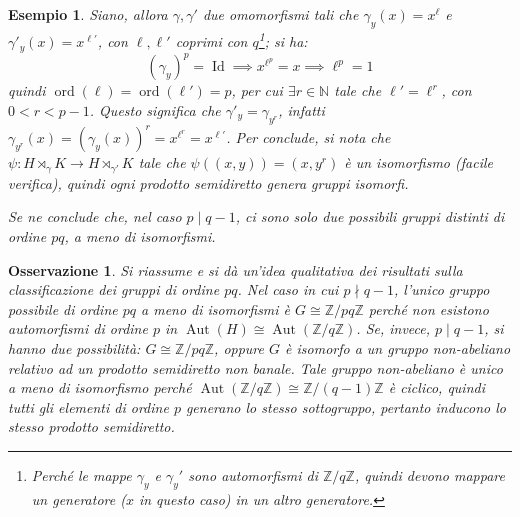 \documentclass[12pt]{scrartcl}
\theoremstyle{style}
\newtheorem{esempio}{Esempio}[section]
\newtheorem{osservazione}{Osservazione}[section]
\numberwithin{equation}{subsection}
\begin{document}
\begin{esempio}
	Siano, allora $\gamma, \gamma'$ due omomorfismi tali che $\gamma_y(x) = x^\ell $ e $\gamma'_y(x) = x^{\ell '} $, con $\ell ,\ell '$ coprimi con $q$\footnote{Perch\'e le mappe $\gamma_y$ e $\gamma_y'$ sono automorfismi di $\mathbb{Z} / q\mathbb{Z}$, quindi devono mappare un generatore ($x$ in questo caso) in un altro generatore.}; si ha:
	\[
		(\gamma_y)^p = \operatorname{Id} \implies x^{\ell ^p} =x\implies \ell ^p = 1
	\] 
	quindi $\operatorname{ord}(\ell ) = \operatorname{ord}(\ell ') =p$, per cui $\exists r \in \mathbb{N}$ tale che $\ell ' = \ell ^r $, con $0 < r < p-1$.
	Questo significa che $\gamma'_y = \gamma_{y^r} $, infatti $\gamma_{y^r} (x) =( \gamma_y(x))^r = x^{\ell ^r} = x^{\ell '} $.
Per conclude, si nota che $\psi : H \rtimes _\gamma K\longrightarrow H \rtimes _{\gamma'} K$ tale che $\psi ((x,y)) = (x,y^r)$ \`e un isomorfismo (facile verifica), quindi ogni prodotto semidiretto genera gruppi isomorfi.

Se ne conclude che, nel caso $p  \mid  q-1$, ci sono solo due possibili gruppi distinti di ordine $pq$, a meno di isomorfismi.
\end{esempio}
\begin{osservazione}
Si riassume e si d\`a un'idea qualitativa dei risultati sulla classificazione dei gruppi di ordine $pq$. 
Nel caso in cui $p  \nmid q-1$, l'unico gruppo possibile di ordine $pq$ a meno di isomorfismi \`e $G \cong \mathbb{Z} / pq\mathbb{Z}$ perch\'e non esistono automorfismi di ordine $p$ in $\operatorname{Aut} (H)\cong \operatorname{Aut} (\mathbb{Z}/q\mathbb{Z})$.
Se, invece, $p  \mid q-1$, si hanno due possibilit\`a: $G \cong \mathbb{Z}/ pq\mathbb{Z}$, oppure $G$ \`e isomorfo a un gruppo non-abeliano relativo ad un prodotto semidiretto non banale. 
Tale gruppo non-abeliano \`e unico a meno di isomorfismo perch\'e $\operatorname{Aut} (\mathbb{Z}/q\mathbb{Z}) \cong \mathbb{Z}/(q-1)\mathbb{Z}$ \`e ciclico, quindi tutti gli elementi di ordine $p$ generano lo stesso sottogruppo, pertanto inducono lo stesso prodotto semidiretto.
\end{osservazione}
\end{document}
